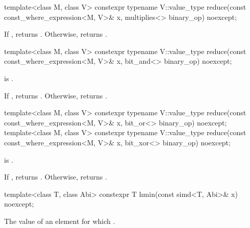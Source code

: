 \begin{itemdecl}
template<class M, class V>
  constexpr typename V::value_type reduce(const const_where_expression<M, V>& x, multiplies<> binary_op) noexcept;
\end{itemdecl}

\begin{itemdescr}
  \pnum\returns
  If , returns . Otherwise, returns  \forallmaskedi.
\end{itemdescr}

\begin{itemdecl}
template<class M, class V>
  constexpr typename V::value_type reduce(const const_where_expression<M, V>& x, bit_and<> binary_op) noexcept;
\end{itemdecl}

\begin{itemdescr}
  \pnum\requires
   is .

  \pnum\returns
  If , returns . Otherwise, returns  \forallmaskedi.
\end{itemdescr}

\begin{itemdecl}
template<class M, class V>
  constexpr typename V::value_type reduce(const const_where_expression<M, V>& x, bit_or<> binary_op) noexcept;
template<class M, class V>
  constexpr typename V::value_type reduce(const const_where_expression<M, V>& x, bit_xor<> binary_op) noexcept;
\end{itemdecl}

\begin{itemdescr}
  \pnum\requires
   is .

  \pnum\returns
  If , returns . Otherwise, returns  \forallmaskedi.
\end{itemdescr}

\begin{itemdecl}
template<class T, class Abi> constexpr T hmin(const simd<T, Abi>& x) noexcept;
\end{itemdecl}

\begin{itemdescr}
  \pnum\returns
  The value of an element  for which  \foralli.
\end{itemdescr}

